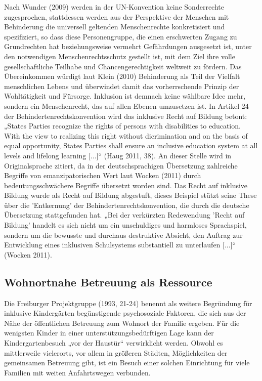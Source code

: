 Nach Wunder (2009) werden in der UN-Konvention keine Sonderrechte zugesprochen, stattdessen werden aus der Perspektive der Menschen mit Behinderung die universell geltenden Menschenrechte konkretisiert und spezifiziert, so dass diese Personengruppe, die einen erschwerten Zugang zu Grundrechten hat beziehungsweise vermehrt Gefährdungen ausgesetzt ist, unter den notwendigen Menschenrechtsschutz gestellt ist, mit dem Ziel ihre volle gesellschaftliche Teilhabe und Chancengerechtigkeit weltweit zu fördern. Das Übereinkommen würdigt laut Klein (2010) Behinderung als Teil der Vielfalt menschlichen Lebens und überwindet damit das vorherrschende Prinzip der Wohltätigkeit und Fürsorge. Inklusion ist demnach keine wählbare Idee mehr, sondern ein Menschenrecht, das auf allen Ebenen umzusetzen ist. In Artikel 24 der Behindertenrechtskonvention wird das inklusive Recht auf Bildung betont: „States Parties recognize the rights of persons with disabilities to education. With the view to realizing this right without dicrimination and on the basis of equal opportunity, States Parties shall ensure an inclusive education system at all levels and lifelong learning [...]“ (Haug 2011, 38). An dieser Stelle wird in Originalsprache zitiert, da in der deutschsprachigen Übersetzung zahlreiche Begriffe von emanzipatorischen Wert laut Wocken (2011) durch bedeutungsschwächere Begriffe übersetzt worden sind. Das Recht auf inklusive Bildung wurde als Recht auf Bildung abgestuft, dieses Beispiel stützt seine These über die 'Entkernung' der Behindertenrechtskonvention, die durch die deutsche Übersetzung stattgefunden hat. „Bei der verkürzten Redewendung 'Recht auf Bildung' handelt es sich nicht um ein unschuldiges und harmloses Sprachspiel, sondern um die bewusste und durchaus destruktive Absicht, den Auftrag zur Entwicklung eines inklusiven Schulsystems substantiell zu unterlaufen [...]“ (Wocken 2011).

\subsection{Wohnortnahe Betreuung als Ressource}
Die Freiburger Projektgruppe (1993, 21-24) benennt als weitere Begründung für inklusive Kindergärten begünstigende psychosoziale Faktoren, die sich aus der Nähe der öffentlichen Betreuung zum Wohnort der Familie ergeben. Für die wenigsten Kinder in einer unterstützungsbedürftigen Lage kann der Kindergartenbesuch „vor der Haustür“ verwirklicht werden. Obwohl es mittlerweile vielerorts, vor allem in größeren Städten, Möglichkeiten der gemeinsamen Betreuung gibt, ist ein Besuch einer solchen Einrichtung für viele Familien mit weiten Anfahrtswegen verbunden. 

